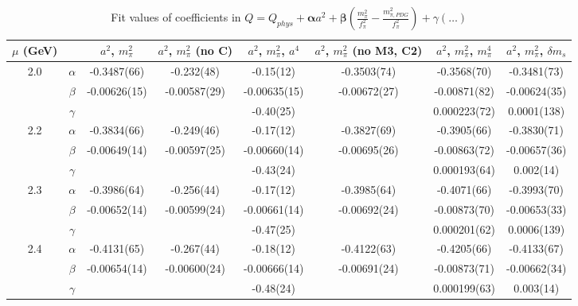 \documentclass[12pt]{extarticle}
\begin{document}
\begin{table}[h!]
\begin{center}
\begin{tabular}{|c c|c|c|c|c|c|c|}
\hline
$\mu$ (GeV) &  & $a^2$, $m_\pi^2$& $a^2$, $m_\pi^2$ (no C)& $a^2$, $m_\pi^2$, $a^4$& $a^2$, $m_\pi^2$ (no M3, C2)& $a^2$, $m_\pi^2$, $m_\pi^4$& $a^2$, $m_\pi^2$, $\delta m_s$\\
\hline
\multirow{3}{0.5in}{2.0} & $\alpha$ & -0.3487(66)& -0.232(48)& -0.15(12)& -0.3503(74)& -0.3568(70)& -0.3481(73)\\
 & $\beta$ & -0.00626(15)& -0.00587(29)& -0.00635(15)& -0.00672(27)& -0.00871(82)& -0.00624(35)\\
 & $\gamma$ &  &  & -0.40(25)&  & 0.000223(72)& 0.0001(138)\\
\hline
\multirow{3}{0.5in}{2.2} & $\alpha$ & -0.3834(66)& -0.249(46)& -0.17(12)& -0.3827(69)& -0.3905(66)& -0.3830(71)\\
 & $\beta$ & -0.00649(14)& -0.00597(25)& -0.00660(14)& -0.00695(26)& -0.00863(72)& -0.00657(36)\\
 & $\gamma$ &  &  & -0.43(24)&  & 0.000193(64)& 0.002(14)\\
\hline
\multirow{3}{0.5in}{2.3} & $\alpha$ & -0.3986(64)& -0.256(44)& -0.17(12)& -0.3985(64)& -0.4071(66)& -0.3993(70)\\
 & $\beta$ & -0.00652(14)& -0.00599(24)& -0.00661(14)& -0.00692(24)& -0.00873(70)& -0.00653(33)\\
 & $\gamma$ &  &  & -0.47(25)&  & 0.000201(62)& 0.0006(139)\\
\hline
\multirow{3}{0.5in}{2.4} & $\alpha$ & -0.4131(65)& -0.267(44)& -0.18(12)& -0.4122(63)& -0.4205(66)& -0.4133(67)\\
 & $\beta$ & -0.00654(14)& -0.00600(24)& -0.00666(14)& -0.00691(24)& -0.00873(71)& -0.00662(34)\\
 & $\gamma$ &  &  & -0.48(24)&  & 0.000199(63)& 0.003(14)\\
\hline
\end{tabular}
\caption{Fit values of coefficients in $Q = Q_{phys} + \mathbf{\alpha} a^2 + \mathbf{\beta}\left(\frac{m_\pi^2}{f_\pi^2}-\frac{m_{\pi,PDG}^2}{f_\pi^2}\right) + \gamma(\ldots)$}
\end{center}
\end{table}





\end{document}
